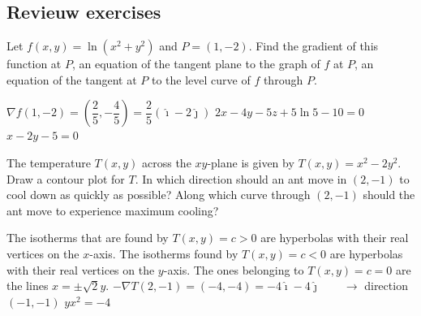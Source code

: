 \subsection*{Revieuw exercises}

\begin{Exercise} Let $f(x,y) = \ln (x^2 + y^2)$ and $P=(1,-2)$. Find
\Question[difficulty=1] the gradient of this function at $P$,
\Question[difficulty=2] an equation of the tangent plane to the graph of $f$ at $P$,
\ifanalysis\Question[difficulty=2]\fi\ifcalculus\Question[difficulty=3]\fi an equation of the tangent at $P$ to the level curve of $f$ through $P$.
\end{Exercise}

\begin{Answer}
    
        \Question $\nabla f(1,-2)= \left(\dfrac{2}{5}, - \dfrac{4}{5} \right) = \dfrac{2}{5}( \hat{\imath} - 2 \hat{\jmath} )$
        \Question $2x-4y-5z+5 \ln 5 -10=0$
        \Question $x-2y-5=0$
    
\end{Answer}


\begin{Exercise} The temperature $T(x,y)$ across the $xy$-plane is given by $ T(x,y) = x^2 - 2y^2$.
\ifanalysis\Question[difficulty=1]\fi\ifcalculus\Question[difficulty=2]\fi Draw a contour plot for $T$.
\Question[difficulty=2] In which direction should an ant move in $(2,-1)$ to cool down as quickly as possible?
\Question[difficulty=3] Along which curve through $(2,-1)$ should the ant move to experience maximum cooling?
\end{Exercise}

\begin{Answer}
    \Question The isotherms that are found by $T(x,y) = c > 0$ are hyperbolas with their real vertices on the $x$-axis. The isotherms found by $T(x,y) = c < 0$ are hyperbolas with their real vertices on the $y$-axis. The ones belonging to $T(x,y) = c = 0$ are the lines $x = \pm \sqrt{2}y$. 
    \Question $- \nabla T(2,-1) = (-4,-4) = -4\hat{\imath}-4 \hat{\jmath}\qquad \rightarrow$ direction $(-1,-1)$
    \Question $ yx^2=-4$
    
\end{Answer}
